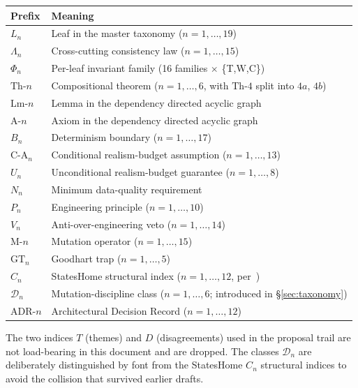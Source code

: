 \documentclass[11pt,a4paper]{article}
\begin{document}
\begin{center}
\begin{tabular}{ll}
\toprule
\textbf{Prefix} & \textbf{Meaning} \\
\midrule
$L_n$           & Leaf in the master taxonomy ($n=1,\dots,19$) \\
$\Lambda_n$     & Cross-cutting consistency law ($n=1,\dots,15$) \\
$\Phi_n$        & Per-leaf invariant family (16 families $\times$ \{T,W,C\}) \\
$\mathrm{Th}\textrm{-}n$ & Compositional theorem ($n=1,\dots,6$, with $\mathrm{Th}\textrm{-}4$ split into $4a$, $4b$) \\
$\mathrm{Lm}\textrm{-}n$ & Lemma in the dependency directed acyclic graph \\
$\mathrm{A}\textrm{-}n$  & Axiom in the dependency directed acyclic graph \\
$B_n$           & Determinism boundary ($n=1,\dots,17$) \\
$\mathrm{C\textrm{-}A}_n$ & Conditional realism-budget assumption ($n=1,\dots,13$) \\
$U_n$           & Unconditional realism-budget guarantee ($n=1,\dots,8$) \\
$N_n$           & Minimum data-quality requirement \\
$P_n$           & Engineering principle ($n=1,\dots,10$) \\
$V_n$           & Anti-over-engineering veto ($n=1,\dots,14$) \\
$\mathrm{M}\textrm{-}n$  & Mutation operator ($n=1,\dots,15$) \\
$\mathrm{GT}_n$ & Goodhart trap ($n=1,\dots,5$) \\
$C_n$           & StatesHome structural index ($n=1,\dots,12$, per~\cite{ledger}) \\
$\mathcal{D}_n$ & Mutation-discipline class ($n=1,\dots,6$; introduced in \S\ref{sec:taxonomy}) \\
$\mathrm{ADR}\textrm{-}n$ & Architectural Decision Record ($n=1,\dots,12$) \\
\bottomrule
\end{tabular}
\end{center}

The two indices $T$ (themes) and $D$ (disagreements) used in the proposal trail are not load-bearing in this document and are dropped. The classes $\mathcal{D}_n$ are deliberately distinguished by font from the StatesHome $C_n$ structural indices to avoid the collision that survived earlier drafts.
\end{document}
